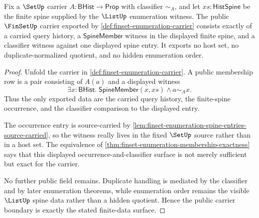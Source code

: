 \begin{theorem}
\label{thm:finset-enumeration-carrier-boundary}
Fix a $\SetUp$ carrier $A:\mathsf{BHist}\to\mathsf{Prop}$ with classifier $\sim_A$, and let $xs:\mathsf{HistSpine}$ be the finite spine supplied by the $\ListUp$ enumeration witness. The public $\FinSetUp$ carrier exported by \autoref{def:finset-enumeration-carrier} consists exactly of a carried query history, a $\mathsf{SpineMember}$ witness in the displayed finite spine, and a classifier witness against one displayed spine entry. It exports no host set, no duplicate-normalized quotient, and no hidden enumeration order.
\end{theorem}
\begin{proof}
Unfold the carrier in \autoref{def:finset-enumeration-carrier}. A public membership row is a pair consisting of $A(a)$ and a displayed witness
$$
\exists x:\mathsf{BHist}.\;\mathsf{SpineMember}(x,xs)\land a\sim_A x.
$$
Thus the only exported data are the carried query history, the finite-spine occurrence, and the classifier comparison to the displayed entry.

The occurrence entry is source-carried by \autoref{lem:finset-enumeration-spine-entries-source-carried}, so the witness really lives in the fixed $\SetUp$ source rather than in a host set. The equivalence of \autoref{thm:finset-enumeration-membership-exactness} says that this displayed occurrence-and-classifier surface is not merely sufficient but exact for the carrier.

No further public field remains. Duplicate handling is mediated by the classifier and by later enumeration theorems, while enumeration order remains the visible $\ListUp$ spine data rather than a hidden quotient. Hence the public carrier boundary is exactly the stated finite-data surface.
\end{proof}
